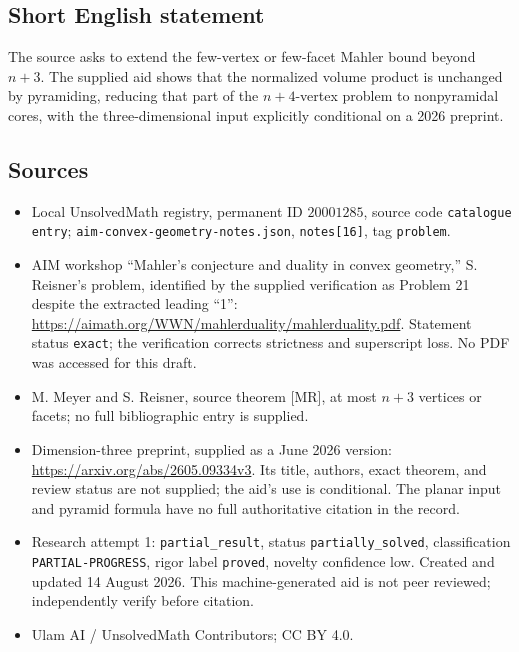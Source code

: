 \documentclass[11pt]{article}
\begin{document}
\subsection{Short English statement}
The source asks to extend the few-vertex or few-facet Mahler bound beyond \(n+3\). The supplied aid shows that the normalized volume product is unchanged by pyramiding, reducing that part of the \(n+4\)-vertex problem to nonpyramidal cores, with the three-dimensional input explicitly conditional on a 2026 preprint.
\subsection{Sources}
\begin{itemize}
\item Local UnsolvedMath registry, permanent ID \(20001285\), source code \texttt{catalogue entry}; \texttt{aim-convex-geometry-notes.json}, \texttt{notes[16]}, tag \texttt{problem}.
\item AIM workshop ``Mahler's conjecture and duality in convex geometry,'' S. Reisner's problem, identified by the supplied verification as Problem 21 despite the extracted leading ``1'': \url{https://aimath.org/WWN/mahlerduality/mahlerduality.pdf}. Statement status \texttt{exact}; the verification corrects strictness and superscript loss. No PDF was accessed for this draft.
\item M. Meyer and S. Reisner, source theorem [MR], at most \(n+3\) vertices or facets; no full bibliographic entry is supplied.
\item Dimension-three preprint, supplied as a June 2026 version: \url{https://arxiv.org/abs/2605.09334v3}. Its title, authors, exact theorem, and review status are not supplied; the aid's use is conditional. The planar input and pyramid formula have no full authoritative citation in the record.
\item Research attempt 1: \texttt{partial\_result}, status \texttt{partially\_solved}, classification \texttt{PARTIAL-PROGRESS}, rigor label \texttt{proved}, novelty confidence low. Created and updated 14 August 2026. This machine-generated aid is not peer reviewed; independently verify before citation.
\item Ulam AI / UnsolvedMath Contributors; CC BY 4.0.
\end{itemize}
\end{document}
